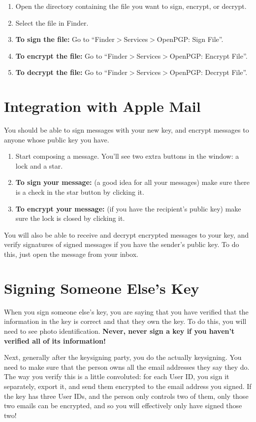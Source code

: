 \documentclass{article}
\begin{document}
\begin{enumerate}
\item Open the directory containing the file you want to sign,
  encrypt, or decrypt.
\item Select the file in Finder.
\item\textbf{To sign the file:} Go to ``Finder$>$Services$>$OpenPGP:
  Sign File''.
\item\textbf{To encrypt the file:} Go to
  ``Finder$>$Services$>$OpenPGP: Encrypt File''.
\item\textbf{To decrypt the file:} Go to
  ``Finder$>$Services$>$OpenPGP: Decrypt File''.
\end{enumerate}

\section*{Integration with Apple Mail}
You should be able to sign messages with your new key, and encrypt
messages to anyone whose public key you have.

\begin{enumerate}
\item Start composing a message.  You'll see two extra buttons in the
  window: a lock and a star.
\item\textbf{To sign your message:} (a good idea for all your
  messages) make sure there is a check in the star button by clicking
  it.
\item\textbf{To encrypt your message:} (if you have the recipient's
  public key) make sure the lock is closed by clicking it.
\end{enumerate}

You will also be able to receive and decrypt encrypted messages to
your key, and verify signatures of signed messages if you have the
sender's public key.  To do this, just open the message from your
inbox.

\section*{Signing Someone Else's Key}
When you sign someone else's key, you are saying that you have
verified that the information in the key is correct and that they own
the key.  To do this, you will need to see photo identification.
\textbf{Never, never sign a key if you haven't verified all of its
  information!}

Next, generally after the keysigning party, you do the actually
keysigning.  You need to make sure that the person owns all the email
addresses they say they do.  The way you verify this is a little
convoluted: for each User ID, you sign it separately, export it, and
send them encrypted to the email address you signed.  If the key has
three User IDs, and the person only controls two of them, only those
two emails can be encrypted, and so you will effectively only have
signed those two!
\end{document}
